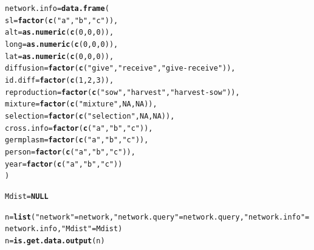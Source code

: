 \documentclass{article}\usepackage[]{graphicx}\usepackage[]{color}
\makeatletter
\newcommand{\hlnum}[1]{\textcolor[rgb]{0.686,0.059,0.569}{#1}}%
\newcommand{\hlstr}[1]{\textcolor[rgb]{0.192,0.494,0.8}{#1}}%
\newcommand{\hlstd}[1]{\textcolor[rgb]{0.345,0.345,0.345}{#1}}%
\newcommand{\hlkwa}[1]{\textcolor[rgb]{0.161,0.373,0.58}{\textbf{#1}}}%
\newcommand{\hlkwb}[1]{\textcolor[rgb]{0.69,0.353,0.396}{#1}}%
\newcommand{\hlkwc}[1]{\textcolor[rgb]{0.333,0.667,0.333}{#1}}%
\newcommand{\hlkwd}[1]{\textcolor[rgb]{0.737,0.353,0.396}{\textbf{#1}}}%
\newenvironment{kframe}{%
 \def\at@end@of@kframe{}%
 \ifinner\ifhmode%
  \def\at@end@of@kframe{\end{minipage}}%
  \begin{minipage}{\columnwidth}%
 \fi\fi%
 \def\FrameCommand##1{\hskip\@totalleftmargin \hskip-\fboxsep
 \colorbox{shadecolor}{##1}\hskip-\fboxsep
     \hskip-\linewidth \hskip-\@totalleftmargin \hskip\columnwidth}%
 \MakeFramed {\advance\hsize-\width
   \@totalleftmargin\z@ \linewidth\hsize
   \@setminipage}}%
 {\par\unskip\endMakeFramed%
 \at@end@of@kframe}
\newenvironment{knitrout}{}{} %
\makeatother
\begin{document}
\begin{appendices}
\begin{knitrout}
\begin{kframe}
\begin{alltt}
\hlstd{network.info} \hlkwb{=} \hlkwd{data.frame}\hlstd{(}
        \hlkwc{sl} \hlstd{=} \hlkwd{factor}\hlstd{(}\hlkwd{c}\hlstd{(}\hlstr{"a"}\hlstd{,} \hlstr{"b"}\hlstd{,} \hlstr{"c"}\hlstd{)),}
        \hlkwc{alt} \hlstd{=} \hlkwd{as.numeric}\hlstd{(}\hlkwd{c}\hlstd{(}\hlnum{0}\hlstd{,} \hlnum{0}\hlstd{,} \hlnum{0}\hlstd{)),}
        \hlkwc{long} \hlstd{=} \hlkwd{as.numeric}\hlstd{(}\hlkwd{c}\hlstd{(}\hlnum{0}\hlstd{,} \hlnum{0}\hlstd{,} \hlnum{0}\hlstd{)),}
        \hlkwc{lat} \hlstd{=} \hlkwd{as.numeric}\hlstd{(}\hlkwd{c}\hlstd{(}\hlnum{0}\hlstd{,} \hlnum{0}\hlstd{,} \hlnum{0}\hlstd{)),}
        \hlkwc{diffusion} \hlstd{=} \hlkwd{factor}\hlstd{(}\hlkwd{c}\hlstd{(}\hlstr{"give"}\hlstd{,} \hlstr{"receive"}\hlstd{,} \hlstr{"give-receive"}\hlstd{)),}
        \hlkwc{id.diff} \hlstd{=} \hlkwd{factor}\hlstd{(}\hlkwd{c}\hlstd{(}\hlnum{1}\hlstd{,} \hlnum{2}\hlstd{,} \hlnum{3}\hlstd{)),}
        \hlkwc{reproduction} \hlstd{=} \hlkwd{factor}\hlstd{(}\hlkwd{c}\hlstd{(}\hlstr{"sow"}\hlstd{,} \hlstr{"harvest"}\hlstd{,} \hlstr{"harvest-sow"}\hlstd{)),}
        \hlkwc{mixture} \hlstd{=} \hlkwd{factor}\hlstd{(}\hlkwd{c}\hlstd{(}\hlstr{"mixture"}\hlstd{,} \hlnum{NA}\hlstd{,} \hlnum{NA}\hlstd{)),}
        \hlkwc{selection} \hlstd{=} \hlkwd{factor}\hlstd{(}\hlkwd{c}\hlstd{(}\hlstr{"selection"}\hlstd{,} \hlnum{NA}\hlstd{,} \hlnum{NA}\hlstd{)),}
        \hlkwc{cross.info} \hlstd{=} \hlkwd{factor}\hlstd{(}\hlkwd{c}\hlstd{(}\hlstr{"a"}\hlstd{,} \hlstr{"b"}\hlstd{,} \hlstr{"c"}\hlstd{)),}
        \hlkwc{germplasm} \hlstd{=} \hlkwd{factor}\hlstd{(}\hlkwd{c}\hlstd{(}\hlstr{"a"}\hlstd{,} \hlstr{"b"}\hlstd{,} \hlstr{"c"}\hlstd{)),}
        \hlkwc{person} \hlstd{=} \hlkwd{factor}\hlstd{(}\hlkwd{c}\hlstd{(}\hlstr{"a"}\hlstd{,} \hlstr{"b"}\hlstd{,} \hlstr{"c"}\hlstd{)),}
        \hlkwc{year} \hlstd{=} \hlkwd{factor}\hlstd{(}\hlkwd{c}\hlstd{(}\hlstr{"a"}\hlstd{,} \hlstr{"b"}\hlstd{,} \hlstr{"c"}\hlstd{))}
\hlstd{)}

\hlstd{Mdist} \hlkwb{=} \hlkwa{NULL}

\hlstd{n} \hlkwb{=} \hlkwd{list}\hlstd{(}\hlstr{"network"} \hlstd{= network,} \hlstr{"network.query"} \hlstd{= network.query,} \hlstr{"network.info"} \hlstd{= network.info,} \hlstr{"Mdist"} \hlstd{= Mdist)}
\hlstd{n} \hlkwb{=} \hlkwd{is.get.data.output}\hlstd{(n)}
\end{alltt}


{\ttfamily\noindent\itshape{}}\end{kframe}
\end{knitrout}



\end{appendices}
\end{document}
